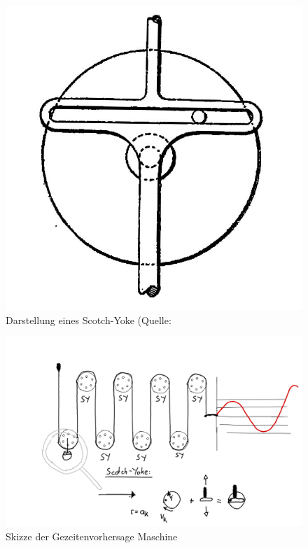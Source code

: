 \begin{figure}
	\centering
	\includegraphics[width=\textwidth]{"papers/gezeiten/Scotch Yoke"}
	\caption{Darstellung eines Scotch-Yoke (Quelle: \cite{gezeiten:Yoke)}
	\label{fig:scotch-yoke}}
\end{figure}

\begin{figure}
	\centering
	\includegraphics[width=\textwidth]{"papers/gezeiten/Skizze Maschine"}
	\caption{Skizze der Gezeitenvorhersage Maschine}
	\label{fig:skizze-maschine}
\end{figure}

